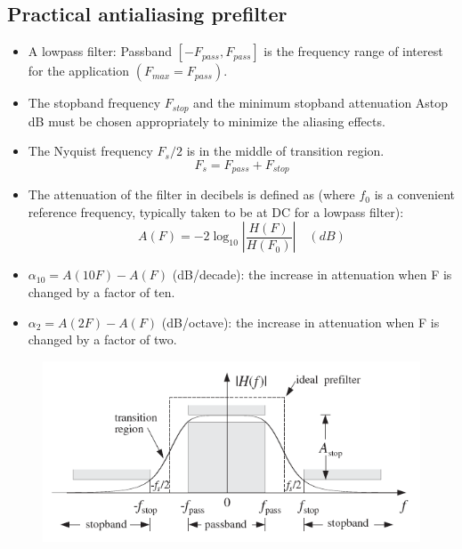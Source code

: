 \subsection{Practical antialiasing prefilter}
\begin{itemize}
    \item A lowpass filter: Passband $[-F_{pass}, F_{pass}]$ is the frequency range of interest for the application $(F_{max}=F_{pass})$.
    \item The stopband frequency $F_{stop}$ and the minimum stopband attenuation Astop dB must be chosen appropriately to minimize the aliasing effects.
    \item The Nyquist frequency $F_s/2$ is in the middle of transition region.
    \begin{equation*}
        F_s = F_{pass}+F_{stop}
    \end{equation*}
    \item The attenuation of the filter in decibels is defined as (where $f_0$ is a convenient reference frequency, typically taken to be at DC for a lowpass filter):
    \begin{equation*}
        A(F) = -2\log_{10}\left|\dfrac{H(F)}{H(F_0)} \right| \quad (dB)
    \end{equation*}
    \item $\alpha_{10} =A(10F)-A(F)$ (dB/decade): the increase in attenuation when F is changed by a factor of ten.
    \item $\alpha_2 =A(2F)-A(F)$ (dB/octave): the increase in attenuation when F is changed by a factor of two.
\end{itemize}
\begin{figure}[h!]
    \centering
    \includegraphics[width=0.5\linewidth]{img/11.png}
\end{figure}




